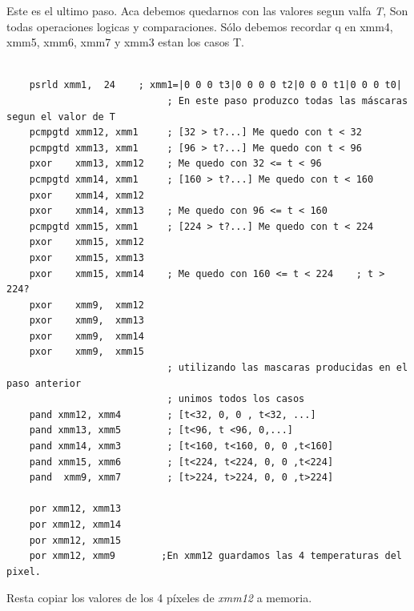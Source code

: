 Este es el ultimo paso. Aca debemos quedarnos con las valores segun valfa \emph{T}, Son todas operaciones logicas y comparaciones.
Sólo debemos recordar q en xmm4,  xmm5, xmm6, xmm7 y xmm3 estan los casos T.
\begin{codesnippet}
\begin{verbatim}				

    psrld xmm1,  24    ; xmm1=|0 0 0 t3|0 0 0 0 t2|0 0 0 t1|0 0 0 t0|
							; En este paso produzco todas las máscaras segun el valor de T
    pcmpgtd xmm12, xmm1     ; [32 > t?...] Me quedo con t < 32
    pcmpgtd xmm13, xmm1     ; [96 > t?...] Me quedo con t < 96
    pxor    xmm13, xmm12    ; Me quedo con 32 <= t < 96
    pcmpgtd xmm14, xmm1     ; [160 > t?...] Me quedo con t < 160
    pxor    xmm14, xmm12
    pxor    xmm14, xmm13    ; Me quedo con 96 <= t < 160
    pcmpgtd xmm15, xmm1     ; [224 > t?...] Me quedo con t < 224
    pxor    xmm15, xmm12
    pxor    xmm15, xmm13
    pxor    xmm15, xmm14    ; Me quedo con 160 <= t < 224    ; t > 224?
    pxor    xmm9,  xmm12
    pxor    xmm9,  xmm13
    pxor    xmm9,  xmm14
    pxor    xmm9,  xmm15
							; utilizando las mascaras producidas en el paso anterior 
							; unimos todos los casos
    pand xmm12, xmm4        ; [t<32, 0, 0 , t<32, ...]
    pand xmm13, xmm5        ; [t<96, t <96, 0,...]
    pand xmm14, xmm3        ; [t<160, t<160, 0, 0 ,t<160]
    pand xmm15, xmm6        ; [t<224, t<224, 0, 0 ,t<224]
    pand  xmm9, xmm7        ; [t>224, t>224, 0, 0 ,t>224]
													
    por xmm12, xmm13
    por xmm12, xmm14
    por xmm12, xmm15
    por xmm12, xmm9        ;En xmm12 guardamos las 4 temperaturas del pixel.
\end{verbatim}
\end{codesnippet}

Resta copiar los valores de los 4 píxeles de \emph{xmm12} a memoria.